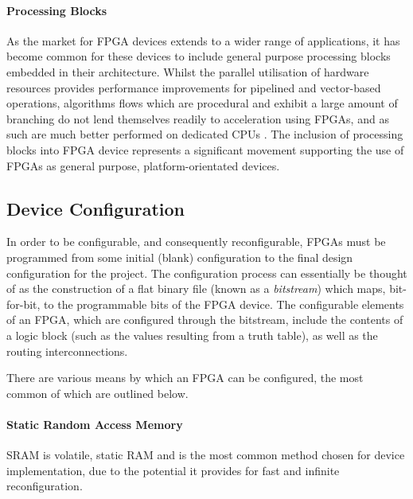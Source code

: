 \paragraph{Processing Blocks}
\label{fpga:architecture:processor}
As the market for \gls{FPGA} devices extends to a wider range of applications,
it has become common for these devices to include general purpose processing
blocks embedded in their architecture. Whilst the parallel utilisation of
hardware resources provides performance improvements for pipelined and
vector-based operations, algorithms flows which are procedural and exhibit a
large amount of branching do not lend themselves readily to acceleration using
\glspl{FPGA}, and as such are much better performed on dedicated \glspl{CPU}
\cite{Hauck:2007}. The inclusion of processing blocks into \gls{FPGA} device
represents a significant movement supporting the use of \glspl{FPGA} as general
purpose, platform-orientated devices.

\subsection{Device Configuration}
\label{fpga:configuration}
In order to be configurable, and consequently reconfigurable, \glspl{FPGA} must
be programmed from some initial (blank) configuration to the final design
configuration for the project. The configuration process can essentially be
thought of as the construction of a flat binary file (known as a
\emph{bitstream}) which maps, bit-for-bit, to the programmable bits of the
\gls{FPGA} device. The configurable elements of an \gls{FPGA}, which are
configured through the bitstream, include the contents of a logic block (such as
the values resulting from a truth table), as well as the routing
interconnections.

There are various means by which an \gls{FPGA} can be configured, the most
common of which are outlined below.

\paragraph{Static Random Access Memory}
\label{fpga:configuration:sram}
\gls{SRAM} is volatile, static \gls{RAM} and is the most common method chosen
for device implementation, due to the potential it provides for fast and
infinite reconfiguration.

